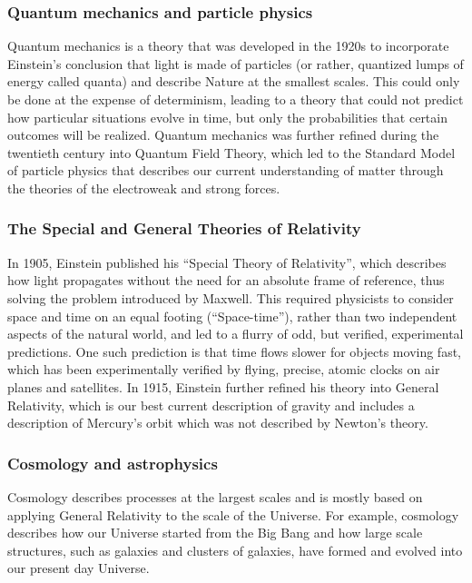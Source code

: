 \subsubsection{Quantum mechanics and particle physics}
Quantum mechanics is a theory that was developed in the 1920s to incorporate Einstein's conclusion that light is made of particles (or rather, quantized lumps of energy called quanta) and describe Nature at the smallest scales. This could only be done at the expense of determinism, leading to a theory that could not predict how particular situations evolve in time, but only the probabilities that certain outcomes will be realized. Quantum mechanics was further refined during the twentieth century into Quantum Field Theory, which led to the Standard Model of particle physics that describes our current understanding of matter through the theories of the electroweak and strong forces.

\subsubsection{The Special and General Theories of Relativity}
In 1905, Einstein published his ``Special Theory of Relativity'', which describes how light propagates without the need for an absolute frame of reference, thus solving the problem introduced by Maxwell. This required physicists to consider space and time on an equal footing (``Space-time''), rather than two independent aspects of the natural world, and led to a flurry of odd, but verified, experimental predictions. One such prediction is that time flows slower for objects moving fast, which has been experimentally verified by flying, precise, atomic clocks on air planes and satellites. In 1915, Einstein further refined his theory into General Relativity, which is our best current description of gravity and includes a description of Mercury's orbit which was not described by Newton's theory.

\subsubsection{Cosmology and astrophysics} 
Cosmology describes processes at the largest scales and is mostly based on applying General Relativity to the scale of the Universe. For example, cosmology describes how our Universe started from the Big Bang and how large scale structures, such as galaxies and clusters of galaxies, have formed and evolved into our present day Universe. 

